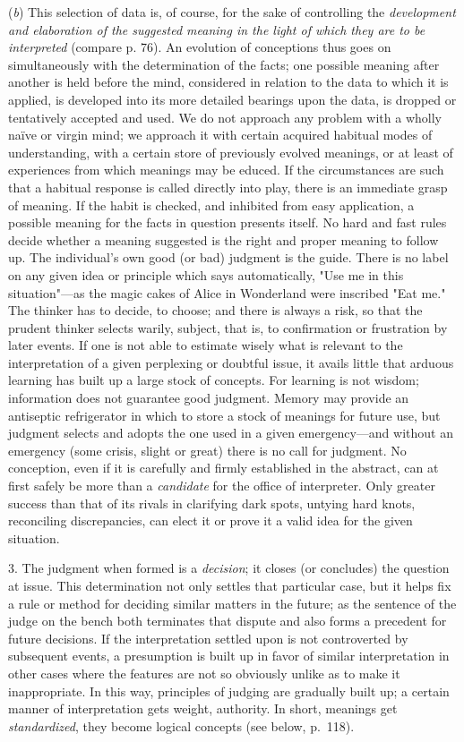\documentclass[showtrims,ustradepaper]{memoir}
\begin{document}
(\emph{b}) This selection of data is, of course, for the sake of
controlling the \emph{development and elaboration of the suggested
meaning in the light of which they are to be interpreted} (compare p.
76). An evolution of conceptions thus goes on simultaneously with the
determination of the facts; one possible meaning after another is held
before the mind, considered in relation to the data to which it is
applied, is developed into its more detailed bearings upon the data, is
dropped or tentatively accepted and used. We do not approach any problem
with a wholly naïve or virgin mind; we approach it with certain acquired
habitual modes of understanding, with a certain store of previously
evolved meanings, or at least of experiences from which meanings may be
educed. If the circumstances are such that a habitual response is called
directly into play, there is an immediate grasp of meaning. If the habit
is checked, and inhibited from easy application, a possible meaning for
the facts in question presents itself. No hard and fast rules decide
whether a meaning suggested is the right and proper meaning to follow
up. The individual's own good (or bad) judgment is the guide. There is
no label on any given idea or principle which says automatically, "Use
me in this situation"---as the magic cakes of Alice in Wonderland were
inscribed "Eat me." The thinker has to decide, to choose; and there is
always a risk, so that the prudent thinker selects warily, subject, that
is, to confirmation or frustration by later events. If one is not able
to estimate wisely what is relevant to the interpretation of a given
perplexing or doubtful issue, it
avails
little that arduous learning has built up a large stock of concepts. For
learning is not wisdom; information does not guarantee good judgment.
Memory may provide an antiseptic refrigerator in which to store a stock
of meanings for future use, but judgment selects and adopts the one used
in a given emergency---and without an emergency (some crisis, slight or
great) there is no call for judgment. No conception, even if it is
carefully and firmly established in the abstract, can at first safely be
more than a \emph{candidate} for the office of interpreter. Only greater
success than that of its rivals in clarifying dark spots, untying hard
knots, reconciling discrepancies, can elect it or prove it a valid idea
for the given situation.


3. The judgment when formed is a \emph{decision}; it closes (or
concludes) the question at issue. This determination not only settles
that particular case, but it helps fix a rule or method for deciding
similar matters in the future; as the sentence of the judge on the bench
both terminates that dispute and also forms a precedent for future
decisions. If the interpretation settled upon is not controverted by
subsequent events, a presumption is built up in favor of similar
interpretation in other cases where the features are not so obviously
unlike as to make it inappropriate. In this way, principles of judging
are gradually built up; a certain manner of interpretation gets weight,
authority. In short, meanings get \emph{standardized}, they become
logical concepts (see below, p.\ 118).
\end{document}
